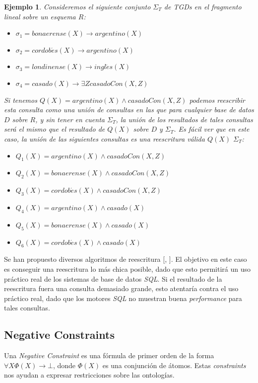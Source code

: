 \documentclass[11pt,a4paper,twoside]{tesis}
\newtheorem{exmp}{Ejemplo}
\begin{document}
\begin{exmp}\label{ejemplo_rewrite}
Consideremos el siguiente conjunto $\Sigma_T$ de TGDs en el fragmento \textit{lineal} sobre un esquema $R$:
    \begin{itemize}
        \item $\sigma_1 = bonaerense(X) \rightarrow argentino(X)$
        \item $\sigma_2 = cordob\acute{e}s(X) \rightarrow argentino(X)$
        \item $\sigma_3 = londinense(X) \rightarrow ingl\acute{e}s(X)$
        \item $\sigma_4 = casado(X) \rightarrow \exists Z casadoCon(X, Z)$
    \end{itemize}
Si tenemos $Q(X) = argentino(X) \land casadoCon(X, Z)$ podemos reescribir esta consulta como una unión de consultas en las que para cualquier base de datos $D$ sobre $R$, y sin tener en cuenta $\Sigma_T$, la unión de los resultados de tales consultas será el mismo que el resultado de $Q(X)$ sobre $D$ y $\Sigma_T$. Es fácil ver que en este caso, la unión de las siguientes consultas es una reescritura válida $Q(X)$ $\Sigma_T$:

    \begin{itemize}
        \item $Q_1(X) = argentino(X) \land casadoCon(X, Z)$
        \item $Q_2(X) = bonaerense(X) \land casadoCon(X, Z)$
        \item $Q_3(X) = cordob\acute{e}s(X) \land casadoCon(X, Z)$
        \item $Q_4(X) = argentino(X) \land casado(X)$
        \item $Q_5(X) = bonaerense(X) \land casado(X)$
        \item $Q_6(X) = cordob\acute{e}s(X) \land casado(X)$
    \end{itemize}
\end{exmp}

Se han propuesto diversos algoritmos de reescritura [\cite{Kewen}, \cite{Gottlob}]. El objetivo en este caso es conseguir una reescritura lo más chica posible, dado que esto permitirá un uso práctico real de los sistemas de base de datos \textit{SQL}. Si el resultado de la reescritura fuera una consulta demasiado grande, esto atentaría contra el uso práctico real, dado que los motores \textit{SQL} no muestran buena \textit{performance} para tales consultas. 

\subsection{Negative Constraints}\label{ncs}
Una \textit{Negative Constraint} es una fórmula de primer orden de la forma $\forall X \Phi (X) \rightarrow \bot$, donde $\Phi(X)$ es una conjunción de átomos. Estas \textit{constraints} nos ayudan a expresar restricciones sobre las ontologías.
\end{document}
